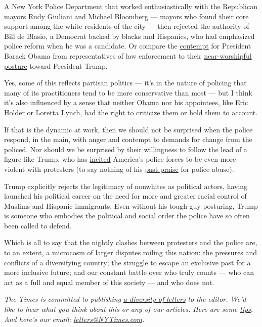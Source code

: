 A New York Police Department that worked enthusiastically with the
Republican mayors Rudy Giuliani and Michael Bloomberg --- mayors who
found their core support among the white residents of the city --- then
rejected the authority of Bill de Blasio, a Democrat backed by blacks
and Hispanics, who had emphasized police reform when he was a candidate.
Or compare the
\href{https://www.politico.com/story/2016/07/obama-war-on-cops-police-advocacy-group-225291}{contempt}
for President Barack Obama from representatives of law enforcement to
their
\href{https://www.cnn.com/videos/politics/2020/06/01/minneapolis-police-union-president-praise-trump-campaign-rally.cnn}{near-worshipful
posture} toward President Trump.

Yes, some of this reflects partisan politics --- it's in the nature of
policing that many of its practitioners tend to be more conservative
than most --- but I think it's also influenced by a sense that neither
Obama nor his appointees, like Eric Holder or Loretta Lynch, had the
right to criticize them or hold them to account.

If that is the dynamic at work, then we should not be surprised when the
police respond, in the main, with anger and contempt to demands for
change from the policed. Nor should we be surprised by their willingness
to follow the lead of a figure like Trump, who has
\href{https://apple.news/A8GNWDXdkSuuf3BPsi8KKUg}{incited} America's
police forces to be even more violent with protesters (to say nothing of
his
\href{https://www.newyorker.com/news/news-desk/donald-trump-is-serious-when-he-jokes-about-police-brutality}{past
praise} for police abuse).

Trump explicitly rejects the legitimacy of nonwhites as political
actors, having launched his political career on the need for more and
greater racial control of Muslims and Hispanic immigrants. Even without
his tough-guy posturing, Trump is someone who embodies the political and
social order the police have so often been called to defend.

Which is all to say that the nightly clashes between protesters and the
police are, to an extent, a microcosm of larger disputes roiling this
nation: the pressures and conflicts of a diversifying country; the
struggle to escape an exclusive past for a more inclusive future; and
our constant battle over who truly counts --- who can act as a full and
equal member of this society --- and who does not.

\emph{The Times is committed to publishing}
\href{https://www.nytimes3xbfgragh.onion/2019/01/31/opinion/letters/letters-to-editor-new-york-times-women.html}{\emph{a
diversity of letters}} \emph{to the editor. We'd like to hear what you
think about this or any of our articles. Here are some}
\href{https://help.nytimes3xbfgragh.onion/hc/en-us/articles/115014925288-How-to-submit-a-letter-to-the-editor}{\emph{tips}}\emph{.
And here's our email:}
\href{mailto:letters@NYTimes.com}{\emph{letters@NYTimes.com}}\emph{.}

